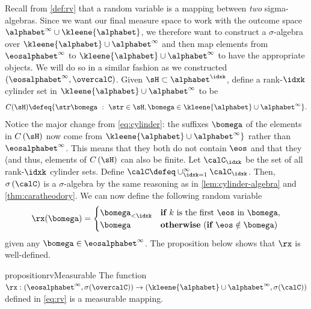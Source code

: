 Recall from \cref{def:rv} that a random variable is a mapping between \emph{two} sigma-algebras.
Since we want our final measure space to work with the outcome space $\alphabet^\infty \cup \kleene{\alphabet}$, we therefore want to construct a $\sigma$-algebra over $\kleene{\alphabet}\cup\alphabet^\infty$ and then map elements from $\eosalphabet^\infty$ to $\kleene{\alphabet}\cup\alphabet^\infty$ to have the appropriate objects. 
We will do so in a similar fashion as we constructed $(\eosalphabet^\infty,\overcalC)$.
Given $\sH\subset \alphabet^\idxk$, define a rank-$\idxk$ cylinder set in $\kleene{\alphabet}\cup\alphabet^\infty$ to be
\begin{align}
    C(\sH)\defeq\{\str\bomega~:~\str\in \sH, \bomega \in \kleene{\alphabet}\cup\alphabet^\infty\}. \label{eq:rv-cylinder}
\end{align}
Notice the major change from \cref{eq:cylinder}: the suffixes $\bomega$ of the elements in $C\left(\sH\right)$ now come from $\kleene{\alphabet}\cup\alphabet^\infty\}$ rather than $\eosalphabet^\infty$.
This means that they both do not contain $\eos$ and that they (and thus, elements of $C\left(\sH\right)$ can also be finite.
Let $\calC_\idxk$ be the set of all rank-$\idxk$ cylinder sets.
Define $\calC \defeq \cup_{\idxk=1}^\infty \calC_\idxk$.
Then, $\sigma\left(\calC\right)$ is a $\sigma$-algebra by the same reasoning as in \cref{lem:cylinder-algebra} and \cref{thm:caratheodory}.
We can now define the following random variable
\begin{align}\label{eq:rv}
\rx(\bomega) = \begin{cases}
\bomega_{<\idxk} & \textbf{if } \text{$k$ is the first $\eos$ in } \bomega,   \\
\bomega & \textbf{otherwise} \text{     (}\textbf{if } \eos \notin \bomega\text{)}
\end{cases}
\end{align}
given any $\bomega\in \eosalphabet^\infty$.
The proposition below shows that $\rx$ is well-defined.
\begin{restatable}{proposition}{rvMeasurable}
The function $\rx:(\eosalphabet^\infty,\sigma(\overcalC))\to(\kleene{\alphabet}\cup\alphabet^\infty, \sigma(\calC))$
defined in \cref{eq:rv} is a measurable mapping.
\end{restatable}

